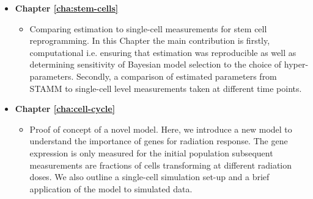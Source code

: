\begin{itemize}
\begin{itemize}
\end{itemize}
\item {\bf Chapter \ref{cha:stem-cells}}
  \begin{itemize}
  \item Comparing estimation to single-cell measurements for stem cell reprogramming. In this Chapter the main contribution is firstly, computational i.e. ensuring that estimation was reproducible as well as determining sensitivity of Bayesian model selection to the choice of hyper-parameters. Secondly, a comparison of estimated parameters from STAMM to single-cell level measurements taken at different time points.
  \end{itemize}

\item {\bf Chapter \ref{cha:cell-cycle}}
  \begin{itemize}
  \item Proof of concept of a novel model. Here, we introduce a new model to understand the importance of genes for radiation response. The gene expression is only measured for the initial population subsequent measurements are fractions of cells transforming at different radiation doses. We also outline a single-cell simulation set-up and a brief application of the model to simulated data.
  \end{itemize}
\end{itemize}



